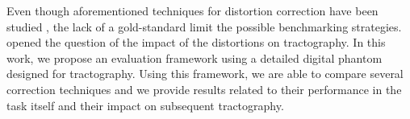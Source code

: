 Even though aforementioned techniques for distortion correction
have been studied \cite{zeng_image_2002,wu_comparison_2008},
the lack of a gold-standard limit the possible benchmarking 
strategies. \cite{irfanoglu_effects_2012} opened the question
of the impact of the distortions on tractography. In this work,
we propose an evaluation framework using a detailed digital 
phantom designed for tractography. Using this framework,
we are able to compare several correction techniques and we
provide results related to their performance in the task
itself and their impact on subsequent tractography.